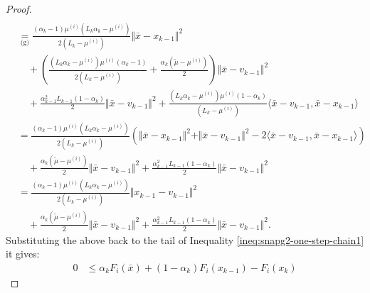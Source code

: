 \documentclass[12pt]{article}
\begin{document}
\begin{proof}
{\begin{align*}
                \\
                & \underset{\text{(g)}}{=} 
                \frac{(\alpha_k - 1)\mu^{(i)}\left(L_k\alpha_k - \mu^{(i)}\right)}
                {2\left(L_k - \mu^{(i)}\right)}\Vert \bar x - x_{k - 1}\Vert^2
                    \\ &\quad 
                    + \left(
                        \frac{
                            \left(L_k \alpha_k - \mu^{(i)}\right)\mu^{(i)}
                            \left(\alpha_k - 1\right)
                        }
                        {2(L_k - \mu^{(i)})}
                        + \frac{\alpha_k(\tilde\mu - \mu^{(i)})}{2}
                    \right) 
                    \Vert \bar x - v_{k - 1}\Vert^2
                    \\ &\quad 
                    + \frac{\alpha_{k - 1}^2L_{k - 1}(1 - \alpha_k)}{2} \Vert \bar x - v_{k - 1}\Vert^2
                    + \frac{(L_k\alpha_k  - \mu^{(i)})\mu^{(i)}(1 - \alpha_k)}{(L_k - \mu^{(i)})}\langle \bar x - v_{k - 1}, \bar x - x_{k - 1}\rangle
                \\
                &= 
                \frac{(\alpha_k - 1)\mu^{(i)}\left(L_k\alpha_k - \mu^{(i)}\right)}{2\left(L_k - \mu^{(i)}\right)}\left(
                    \Vert \bar x - x_{k - 1}\Vert^2 + \Vert \bar x - v_{k - 1}\Vert^2 - 2\langle \bar x - v_{k - 1}, \bar x - x_{k - 1}\rangle
                \right) 
                    \\ &\quad 
                    + \frac{\alpha_k(\tilde\mu - \mu^{(i)})}{2} \Vert \bar x - v_{k - 1}\Vert^2
                    + \frac{\alpha_{k - 1}^2L_{k - 1}(1 - \alpha_k)}{2} \Vert \bar x - v_{k - 1}\Vert^2
                \\
                &= \frac{(\alpha_k - 1)\mu^{(i)}\left(L_k\alpha_k - \mu^{(i)}\right)}{2\left(L_k - \mu^{(i)}\right)}
                    \Vert x_{k - 1} - v_{k - 1} \Vert^2
                    \\ &\quad 
                    + \frac{\alpha_k(\tilde\mu - \mu^{(i)})}{2} \Vert \bar x - v_{k - 1}\Vert^2
                    + \frac{\alpha_{k - 1}^2L_{k - 1}(1 - \alpha_k)}{2} \Vert \bar x - v_{k - 1}\Vert^2.
            \end{align*}
            }
            Substituting the above back to the tail of Inequality \eqref{ineq:snapg2-one-step-chain1} it gives: 
            {\allowdisplaybreaks
            \begin{align*}
                0 &\le 
                \alpha_k F_i(\bar x) + (1 - \alpha_k)F_i(x_{k - 1}) - F_i(x_k) 

\end{align*}}
\end{proof}
\end{document}
